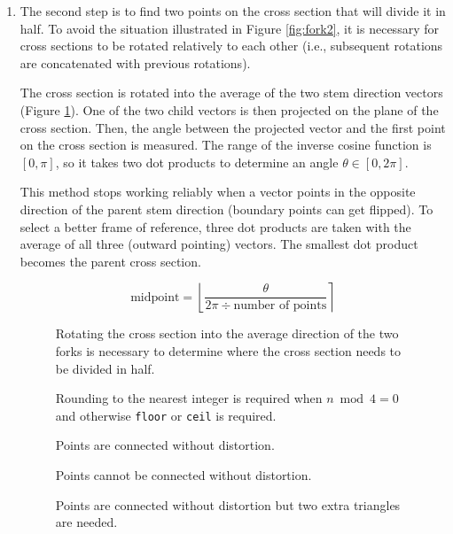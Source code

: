\documentclass[10pt]{article}
\begin{document}
\begin{enumerate}
\item The second step is to find two points on the cross section that will divide it in half. To avoid the situation illustrated in Figure \ref{fig:fork2}, it is necessary for cross sections to be rotated relatively to each other (i.e., subsequent rotations are concatenated with previous rotations).

The cross section is rotated into the average of the two stem direction vectors (Figure \ref{fig:forkdiv}). One of the two child vectors is then projected on the plane of the cross section. Then, the angle between the projected vector and the first point on the cross section is measured. The range of the inverse cosine function is $ [0, \pi] $, so it takes two dot products to determine an angle $ \theta \in [0, 2\pi] $.

This method stops working reliably when a vector points in the opposite direction of the parent stem direction (boundary points can get flipped). To select a better frame of reference, three dot products are taken with the average of all three (outward pointing) vectors. The smallest dot product becomes the parent cross section.

\[ \text{midpoint} = \left\lfloor \frac{\theta}{2\pi \div \text{number of points}} \right\rceil \]

\begin{figure}[H]
 \begin{minipage}[H]{0.49\textwidth}
  \centering
  
  \caption{Rotating the cross section into the average direction of the two forks is necessary to determine where the cross section needs to be divided in half.} \label{fig:forkdiv}
 \end{minipage}
 \hfill
 \begin{minipage}[H]{0.48\textwidth}
  \centering
  
  \caption{Rounding to the nearest integer is required when $ n \bmod 4 = 0 $ and otherwise \texttt{floor} or \texttt{ceil} is required.}
 \end{minipage}
\end{figure}
\begin{figure}[H]
 \begin{minipage}[H]{0.24\textwidth}
  \centering
  
  \caption{Points are connected without distortion.} \label{fig:fork1}
 \end{minipage}
 \hfill
 \begin{minipage}[H]{0.24\textwidth}
  \centering
  
  \caption{Points cannot be connected without distortion.} \label{fig:fork2}
 \end{minipage}
 \hfill
 \begin{minipage}[H]{0.4\textwidth}
  \centering
  
  \caption{Points are connected without distortion but two extra triangles are needed.} \label{fig:fork3}
 \end{minipage}
\end{figure}


\end{enumerate}
\end{document}
